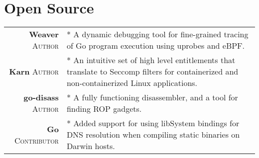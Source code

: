 \documentclass[a4paper,10pt]{article}
\begin{document}
\section{Open Source}
\begin{tabular}{rp{11cm}}

\textbf{Weaver} \textsc{Author} 
&\footnotesize{
    *  A dynamic debugging tool for fine-grained tracing of Go program execution using uprobes and eBPF.
}\\

\textbf{Karn} \textsc{Author}

&\footnotesize{
    * An intuitive set of high level entitlements that translate to Seccomp filters for containerized and non-containerized Linux applications.
}\\

\textbf{go-disass} \textsc{Author} 
&\footnotesize{
    * A fully functioning disassembler, and  a tool for finding ROP gadgets.
}\\

\textbf{Go} \textsc{Contributor}

&\footnotesize{
    * Added support for using libSystem bindings for DNS resolution when compiling static binaries on Darwin hosts.
}\\

\end{tabular}
\end{document}
